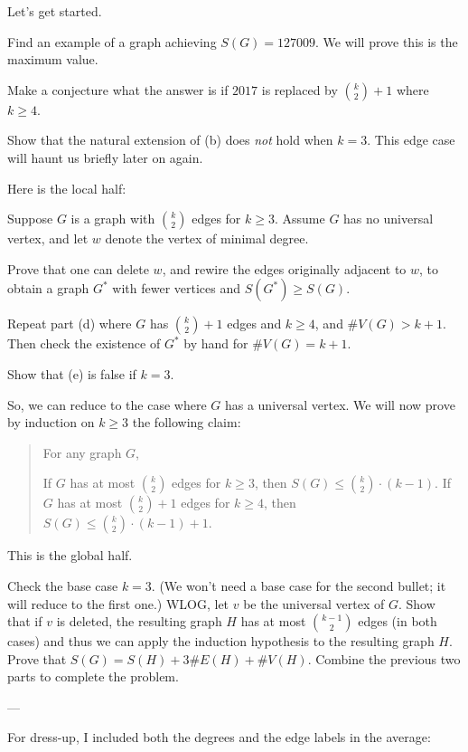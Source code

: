 Let's get started.
\begin{walk}
  \ii Find an example of a graph achieving $S(G) = 127009$.
  We will prove this is the maximum value.

  \ii Make a conjecture what the answer is if $2017$
  is replaced by $\binom k2+1$ where $k \ge 4$.

  \ii Show that the natural extension of (b) does \emph{not} hold when $k = 3$.
  This edge case will haunt us briefly later on again.
\end{walk}
Here is the local half:
\begin{walk}[resume]
  \ii Suppose $G$ is a graph with $\binom k2$ edges for $k \ge 3$.
  Assume $G$ has no universal vertex,
  and let $w$ denote the vertex of minimal degree.

  Prove that one can delete $w$, and rewire the edges originally adjacent to $w$,
  to obtain a graph $G^\ast$ with fewer vertices and $S(G^\ast) \ge S(G)$.

  \ii Repeat part (d) where $G$ has $\binom k2 + 1$ edges
  and $k \ge 4$, and $\#V(G) > k+1$.
  Then check the existence of $G^\ast$ by hand for $\#V(G) = k+1$.

  \ii Show that (e) is false if $k=3$.
\end{walk}
So, we can reduce to the case where $G$ has a universal vertex.
We will now prove by induction on $k \ge 3$ the following claim:
\begin{quote}
  For any graph $G$,
  \begin{itemize}
    \ii If $G$ has at most $\binom k2$ edges for $k \ge 3$,
    then $S(G) \le \binom k2 \cdot (k-1)$.
    \ii If $G$ has at most $\binom k2 + 1$ edges for $k \ge 4$,
    then $S(G) \le \binom k2 \cdot (k-1) + 1$.
  \end{itemize}
\end{quote}
This is the global half.
\begin{walk}[resume]
  \ii Check the base case $k=3$.
  (We won't need a base case for the second bullet;
  it will reduce to the first one.)
  \ii WLOG, let $v$ be the universal vertex of $G$.
  Show that if $v$ is deleted,
  the resulting graph $H$ has at most $\binom{k-1}{2}$ edges
  (in both cases) and thus we can apply
  the induction hypothesis to the resulting graph $H$.
  \ii Prove that $S(G) = S(H) + 3\#E(H) + \#V(H)$.
  \ii Combine the previous two parts to complete the problem.
\end{walk}


---

For dress-up, I included both the degrees and the edge labels in the average:

